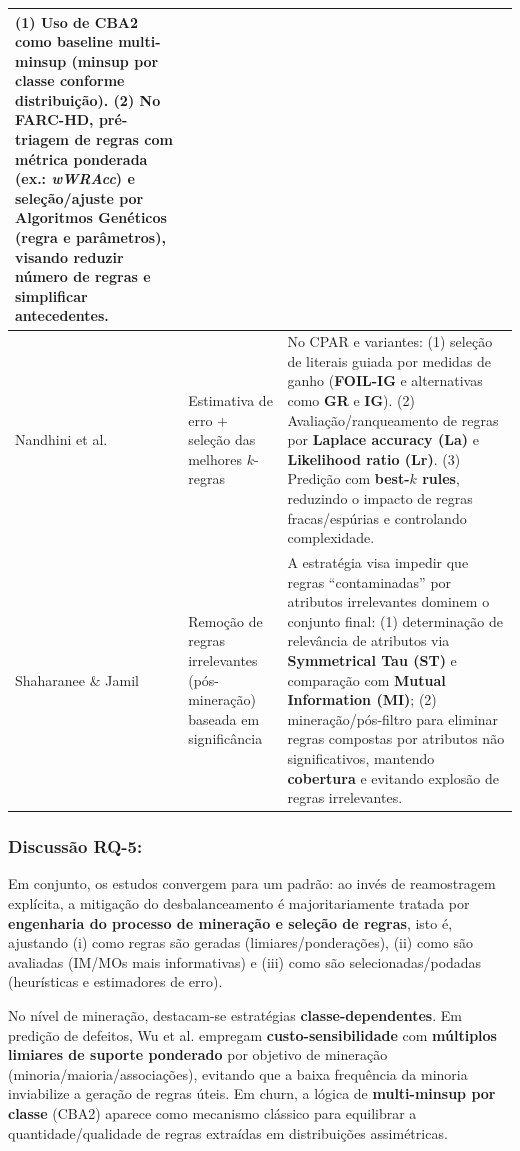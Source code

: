 \begin{table}[H]
\begin{tabularx}{\textwidth}{|p{3.2cm}|p{3.6cm}|>{\raggedright\arraybackslash}X|}
(1) Uso de \textbf{CBA2} como baseline \textbf{multi-minsup} (minsup por classe conforme distribuição). (2) No \textbf{FARC-HD}, \textbf{pré-triagem} de regras com métrica ponderada (ex.: \textit{wWRAcc}) e \textbf{seleção/ajuste por Algoritmos Genéticos} (regra e parâmetros), visando \textbf{reduzir número de regras} e simplificar antecedentes. \\
\hline
Nandhini et al. \cite{nandhini2020performance} &
Estimativa de erro + seleção das melhores $k$-regras &
No CPAR e variantes: (1) seleção de literais guiada por medidas de ganho (\textbf{FOIL-IG} e alternativas como \textbf{GR} e \textbf{IG}). (2) Avaliação/ranqueamento de regras por \textbf{Laplace accuracy (La)} e \textbf{Likelihood ratio (Lr)}. (3) Predição com \textbf{best-$k$ rules}, reduzindo o impacto de regras fracas/espúrias e controlando complexidade. \\
\hline
Shaharanee \& Jamil \cite{shaharanee2015irrelevant} &
Remoção de regras irrelevantes (pós-mineração) baseada em significância &
A estratégia visa impedir que regras “contaminadas” por atributos irrelevantes dominem o conjunto final: (1) determinação de relevância de atributos via \textbf{Symmetrical Tau (ST)} e comparação com \textbf{Mutual Information (MI)}; (2) mineração/pós-filtro para eliminar regras compostas por atributos não significativos, mantendo \textbf{cobertura} e evitando explosão de regras irrelevantes. \\
\hline
\end{tabularx}
\end{table}

\subsubsection{Discussão RQ-5:}
Em conjunto, os estudos convergem para um padrão: ao invés de reamostragem explícita, a mitigação do desbalanceamento é majoritariamente tratada por \textbf{engenharia do processo de mineração e seleção de regras}, isto é, ajustando (i) como regras são geradas (limiares/ponderações), (ii) como são avaliadas (IM/MOs mais informativas) e (iii) como são selecionadas/podadas (heurísticas e estimadores de erro).

No nível de mineração, destacam-se estratégias \textbf{classe-dependentes}. Em predição de defeitos, Wu et al. empregam \textbf{custo-sensibilidade} com \textbf{múltiplos limiares de suporte ponderado} por objetivo de mineração (minoria/maioria/associações), evitando que a baixa frequência da minoria inviabilize a geração de regras úteis. Em churn, a lógica de \textbf{multi-minsup por classe} (CBA2) aparece como mecanismo clássico para equilibrar a quantidade/qualidade de regras extraídas em distribuições assimétricas.


